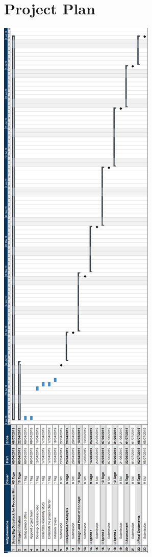 \documentclass[runningheads]{llncs}
\begin{document}
\section{Project Plan}
\includegraphics[scale=.3333]{Gantt.jpg}
\end{document}
